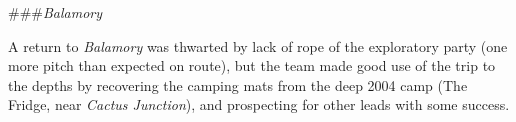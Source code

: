 \#\#\#\emph{Balamory}

A return to \emph{Balamory} was thwarted by lack of rope of the
exploratory party (one more pitch than expected on route), but the team
made good use of the trip to the depths by recovering the camping mats
from the deep 2004 camp (The Fridge, near \emph{Cactus Junction}), and
prospecting for other leads with some success.
